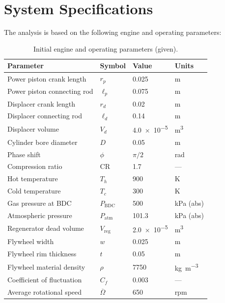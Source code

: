 \documentclass[12pt]{article}
\begin{document}
\section{System Specifications}
The analysis is based on the following engine and operating parameters:
\begin{table}[H]
  \centering
  \caption{Initial engine and operating parameters (given).}
  \label{tab:params}
  \begin{tabular}{@{}llll@{}}
    \toprule
    \textbf{Parameter} & \textbf{Symbol} & \textbf{Value} & \textbf{Units} \\
    \midrule
    Power piston crank length & $r_{p}$ & \num{0.025} & \si{\meter} \\
    Power piston connecting rod & $\ell_{p}$ & \num{0.075} & \si{\meter} \\
    Displacer crank length & $r_{d}$ & \num{0.02} & \si{\meter} \\
    Displacer connecting rod & $\ell_{d}$ & \num{0.14} & \si{\meter} \\
    Displacer volume & $V_{d}$ & \num{4.0e-5} & \si{\meter\cubed} \\
    Cylinder bore diameter & $D$ & \num{0.05} & \si{\meter} \\
    Phase shift & $\phi$ & $\pi/2$ & \si{\radian} \\
    Compression ratio & $\mathrm{CR}$ & \num{1.7} & --- \\
    Hot temperature & $T_{h}$ & \num{900} & \si{\kelvin} \\
    Cold temperature & $T_{c}$ & \num{300} & \si{\kelvin} \\
    Gas pressure at BDC & $P_{\mathrm{BDC}}$ & \num{500} & \si{\kilo\pascal} (abs) \\
    Atmospheric pressure & $P_{\mathrm{atm}}$ & \num{101.3} & \si{\kilo\pascal} (abs) \\
    Regenerator dead volume & $V_{\mathrm{reg}}$ & \num{2.0e-5} & \si{\meter\cubed} \\
    Flywheel width & $w$ & \num{0.025} & \si{\meter} \\
    Flywheel rim thickness & $t$ & \num{0.05} & \si{\meter} \\
    Flywheel material density & $\rho$ & \num{7750} & \si{\kilo\gram\per\meter\cubed} \\
    Coefficient of fluctuation & $C_{f}$ & \num{0.003} & --- \\
    Average rotational speed & $\overline{\Omega}$ & \num{650} & \si{rpm} \\
    \bottomrule
  \end{tabular}
\end{table}
\end{document}
